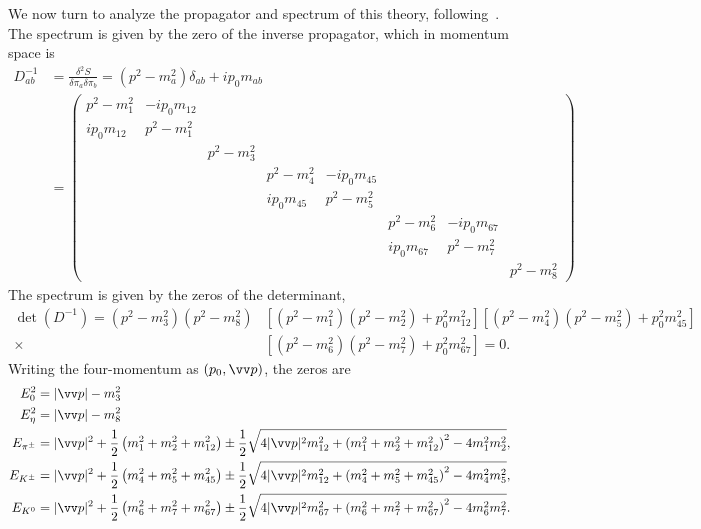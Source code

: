 We now turn to analyze the propagator and spectrum of this theory, following~\autocite{adhikariTwoflavorChiralPerturbation2019,adhikariQuarkPionAxial2021a}.
The spectrum is given by the zero of the inverse propagator, which in momentum space is
%
\begin{align}
    \nonumber
    D_{ab}^{-1} 
    &= \frac{\delta^2S}{\delta \pi_a \delta \pi_b}
    =
    (p^2 - m_a^2)\delta_{ab} + i p_0 m_{ab}\\
    &= 
    \begin{pmatrix}
        p^2 - m_1^2 & -ip_0 m_{12} &&&&&&\\
        ip_0 m_{12} & p^2 - m_1^2 &&&&&&\\
        &&p^2 - m_3^2&&&&&\\
        &&&p^2 - m_4^2&-ip_0 m_{45}&&&\\
        &&&ip_0 m_{45}&p^2 - m_5^2&&&\\
        &&&&&p^2 - m_6^2&-ip_0 m_{67}&\\
        &&&&&ip_0 m_{67}&p^2 - m_7^2&\\
        &&&&&&&p^2 - m_8^2
    \end{pmatrix}
\end{align}
%
The spectrum is given by the zeros of the determinant,
%
\begin{align}
    \nonumber
    \det\left(D^{-1}\right)
    =
    (p^2 - m_3^2)(p^2 - m_8^2) 
    &\left[ (p^2 - m_1^2)(p^2 - m_2^2) + p_0^2m_{12}^2  \right]
    \left[ (p^2 - m_4^2)(p^2 - m_5^2) + p_0^2m_{45}^2  \right]\\
    \times&\left[ (p^2 - m_6^2)(p^2 - m_7^2) + p_0^2m_{67}^2  \right]
    = 0.
\end{align}
%
Writing the four-momentum as $(p_0, \vv p)$, the zeros are
%
\begin{align}
    E_0^2 &= |\vv p | - m_3^2 \\
    E_\eta^2 &= |\vv p | - m_8^2 \\
    E_\pipm
    & = |\vv p|^2 +
    \frac{1}{2}
    \left(
        m_1^2 + m_2^2 + m_{12}^2 
    \right)
    \pm 
    \frac{1}{2}
    \sqrt{
        4|\vv p|^2m_{12}^2 
        +
        \left(
            m_1^2 + m_2^2 + m_{12}^2
        \right)^2
        - 4 m_1^2 m_2^2
    }, \\
    E_\Kpm
    & = |\vv p|^2 +
    \frac{1}{2}
    \left(
        m_4^2 + m_5^2 + m_{45}^2 
    \right)
    \pm 
    \frac{1}{2}
    \sqrt{
        4|\vv p|^2m_{12}^2 
        +
        \left(
            m_4^2 + m_5^2 + m_{45}^2
        \right)^2
        - 4 m_4^2 m_5^2
    },\\
    E_\Ko
    & = |\vv p|^2 +
    \frac{1}{2}
    \left(
        m_6^2 + m_7^2 + m_{67}^2 
    \right)
    \pm 
    \frac{1}{2}
    \sqrt{
        4|\vv p|^2m_{67}^2 
        +
        \left(
            m_6^2 + m_7^2 + m_{67}^2
        \right)^2
        - 4 m_6^2 m_7^2
    }.
\end{align}






